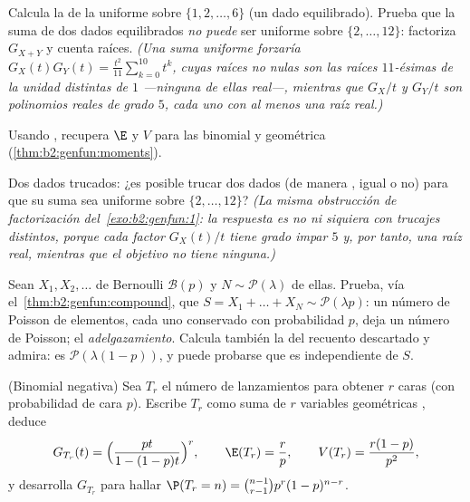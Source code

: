 \begin{exercise}[$\star$]\label{exo:b2:genfun:1}
Calcula la  de la  uniforme sobre $\{1, 2,
\dots, 6\}$ (un dado equilibrado). Prueba que la suma de dos dados
equilibrados \emph{no puede} ser uniforme sobre $\{2, \dots, 12\}$:
factoriza $G_{X+Y}$ y cuenta raíces. \emph{(Una suma uniforme
forzaría $G_X(t)G_Y(t) = \frac{t^2}{11}\sum_{k=0}^{10}t^k$, cuyas
raíces no nulas son las raíces $11$-ésimas de la unidad distintas de
$1$ ---ninguna de ellas real---, mientras que $G_X/t$ y $G_Y/t$ son
polinomios reales de grado $5$, cada uno con al menos una raíz
real.)}
\end{exercise}

\begin{exercise}[$\star$]\label{exo:b2:genfun:2}
Usando , recupera $\E$ y $V$ para las 
binomial y geométrica (\cref{thm:b2:genfun:moments}).
\end{exercise}

\begin{exercise}[$\star$]\label{exo:b2:genfun:3}
Dos dados trucados: ¿es posible trucar dos dados (de manera
, igual o no) para que su suma sea uniforme sobre $\{2,
\dots, 12\}$? \emph{(La misma obstrucción de factorización del~\cref{exo:b2:genfun:1}: la respuesta es no ni siquiera con trucajes
distintos, porque cada factor $G_X(t)/t$ tiene grado impar $5$ y, por
tanto, una raíz real, mientras que el objetivo no tiene ninguna.)}
\end{exercise}

\begin{exercise}[$\star\star$]\label{exo:b2:genfun:4}
Sean $X_1, X_2, \dots$ de Bernoulli $\mathcal{B}(p)$  y
$N \sim \mathcal{P}(\lambda)$  de ellas. Prueba, vía el~\cref{thm:b2:genfun:compound}, que $S = X_1 + \dots + X_N \sim
\mathcal{P}(\lambda p)$: un número de Poisson de elementos, cada uno
conservado con probabilidad $p$, deja un número de Poisson; el
\emph{adelgazamiento}. Calcula también la  del recuento
descartado y admira: es $\mathcal{P}(\lambda(1-p))$, y puede probarse
que es independiente de $S$.
\end{exercise}

\begin{exercise}[$\star\star$]\label{exo:b2:genfun:5}
(Binomial negativa) Sea $T_r$ el número de lanzamientos para obtener
$r$ caras (con probabilidad de cara $p$). Escribe $T_r$ como suma de
$r$ variables geométricas , deduce
\[
G_{T_r}(t) = \Bigl(\frac{pt}{1 - (1-p)t}\Bigr)^{r},
\qquad
\E(T_r) = \frac rp,
\qquad
V(T_r) = \frac{r(1-p)}{p^2},
\]
y desarrolla $G_{T_r}$ para hallar $\P(T_r = n) = \binom{n-1}{r-1}
p^r(1-p)^{n-r}$.
\end{exercise}


